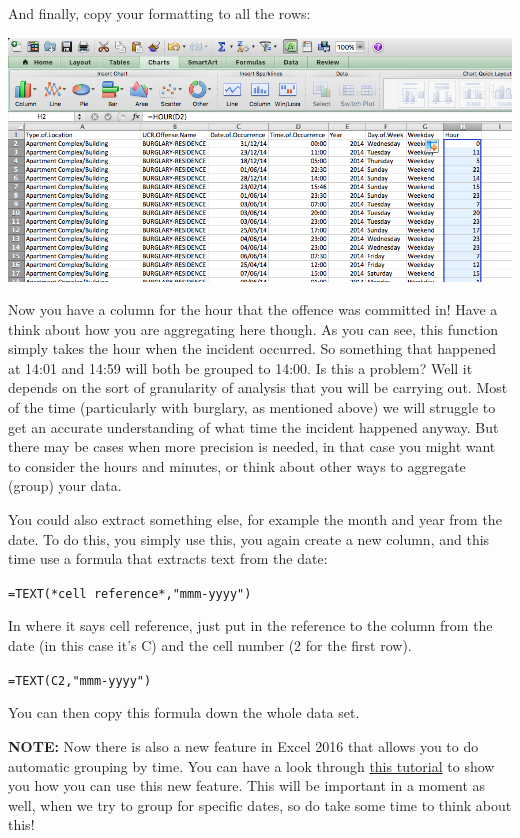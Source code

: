 \documentclass[
]{book}
\begin{document}
And finally, copy your formatting to all the rows:

\includegraphics{imgs/hour_3.png}

Now you have a column for the hour that the offence was committed in! Have a think about how you are aggregating here though. As you can see, this function simply takes the hour when the incident occurred. So something that happened at 14:01 and 14:59 will both be grouped to 14:00. Is this a problem? Well it depends on the sort of granularity of analysis that you will be carrying out. Most of the time (particularly with burglary, as mentioned above) we will struggle to get an accurate understanding of what time the incident happened anyway. But there may be cases when more precision is needed, in that case you might want to consider the hours and minutes, or think about other ways to aggregate (group) your data.

You could also extract something else, for example the month and year from the date. To do this, you simply use this, you again create a new column, and this time use a formula that extracts text from the date:

\texttt{=TEXT(*cell\ reference*,"mmm-yyyy")}

In where it says cell reference, just put in the reference to the column from the date (in this case it's C) and the cell number (2 for the first row).

\texttt{=TEXT(C2,"mmm-yyyy")}

You can then copy this formula down the whole data set.

\textbf{NOTE:} Now there is also a new feature in Excel 2016 that allows you to do automatic grouping by time. You can have a look through \href{https://blogs.office.com/en-us/2015/10/13/time-grouping-enhancements-in-excel-2016/?eu=true}{this tutorial} to show you how you can use this new feature. This will be important in a moment as well, when we try to group for specific dates, so do take some time to think about this!
\end{document}
